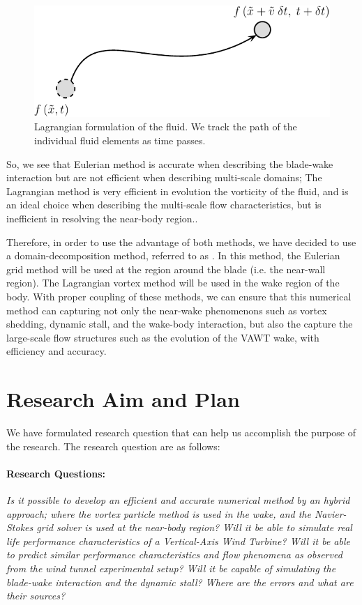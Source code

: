 	\begin{figure}[!t]
		\centering
		\includegraphics[width=0.4\linewidth]{figures/introduction/lagrangianRF2-crop.pdf}
		\caption{Lagrangian formulation of the fluid. We track the path of the individual fluid elements as time passes.}
		\label{fig:lagrangianRF}
	\end{figure}

So, we see that Eulerian method is accurate when describing the blade-wake interaction but are not efficient when describing multi-scale domains; The Lagrangian method is very efficient in evolution the vorticity of the fluid, and is an ideal choice when describing the multi-scale flow characteristics, but is inefficient in resolving the near-body region.. 

Therefore, in order to use the advantage of both methods, we have decided to use a domain-decomposition method, referred to as . In this method, the Eulerian grid method will be used at the region around the blade (i.e. the near-wall region). The Lagrangian vortex method will be used in the wake region of the body. With proper coupling of these methods, we can ensure that this numerical method can capturing not only the near-wake phenomenons such as vortex shedding, dynamic stall, and the wake-body interaction, but also the capture the large-scale flow structures such as the evolution of the VAWT wake, with efficiency and accuracy.

\section{Research Aim and Plan}

We have formulated research question that can help us accomplish the purpose of the research. The research question are as follows:

\paragraph*{Research Questions:} \textit{Is it possible to develop an efficient and accurate numerical method by an
hybrid approach; where the vortex particle method is used in the wake, and the Navier-Stokes grid solver is
used at the near-body region? Will it be able to simulate real life performance characteristics of a Vertical-Axis Wind Turbine? Will it be able to predict similar performance characteristics and flow phenomena as observed from the wind tunnel experimental setup? Will it be capable of simulating the blade-wake interaction
and the dynamic stall? Where are the errors and what are their sources?}

